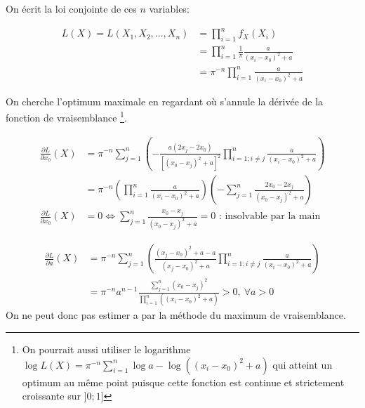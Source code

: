 \documentclass[12pt,a4paper,titlepage]{article}
\numberwithin{equation}{section}
\begin{document}
On écrit la loi conjointe de ces $n$ variables:

\begin{align*}
L (X) = L\left( {{X_1},{X_2},...,{X_n}} \right) & = \prod\limits_{i = 1}^n {{f_X}\left( {{X_i}} \right)} \\
& = \prod\limits_{i = 1}^n {\frac{1}{\pi }\frac{a}{{{{\left( {{x_i} - {x_0}} \right)}^2} + a}}} \\
& = {\pi ^{ - n}}\prod\limits_{i = 1}^n {\frac{a}{{{{\left( {{x_i} - {x_0}} \right)}^2} + a}}}
\end{align*}

On cherche l'optimum maximale en regardant où s'annule la dérivée de la fonction de vraisemblance
\footnote{On pourrait aussi utiliser le logarithme $\log{L(X)} = \pi^{-n} \sum\limits_{i=1}^{n} \log{a} -
\log{((x_i-x_0)^2+a)}$ qui atteint un optimum au même point puisque cette fonction est continue et strictement croissante
sur $]0;1]$}.

\begin{align*}
\frac{{\partial L}}{{\partial {x_0}}}\left( X \right) & = {\pi ^{ - n}}\sum\limits_{j = 1}^n {\left( { - \frac{{a\left( {2{x_j} - 2{x_0}} \right)}}{{{{\left[ {{{\left( {{x_0} - {x_j}} \right)}^2} + a} \right]}^2}}}\prod\limits_{i = 1;i \ne j}^n {\frac{a}{{{{\left( {{x_i} - {x_0}} \right)}^2} + a}}} } \right)}\\
&  = {\pi ^{ - n}}\left( {\prod\limits_{i = 1}^n {\frac{a}{{{{\left( {{x_i} - {x_0}} \right)}^2} + a}}} } \right)\left( { - \sum\limits_{j = 1}^n {\frac{{2{x_0} - 2{x_j}}}{{{{\left( {{x_0} - {x_j}} \right)}^2} + a}}} } \right) \\
\frac{{\partial L}}{{\partial {x_0}}}\left( X \right) & = 0 \Leftrightarrow \sum\limits_{j = 1}^n {\frac{{{x_0} - {x_j}}}{{{{\left( {{x_0} - {x_j}} \right)}^2} + a}}}  = 0 \text{ : insolvable par la main}
\end{align*}

\begin{align*}
\frac{{\partial L}}{{\partial a}}\left( X \right) & = {\pi ^{ - n}}\sum\limits_{j = 1}^n {\left( {\frac{{{{\left( {{x_j} - {x_0}} \right)}^2} + a - a}}{{{{\left( {{x_j} - {x_0}} \right)}^2} + a}}\prod\limits_{i = 1;i \ne j}^n {\frac{a}{{{{\left( {{x_i} - {x_0}} \right)}^2} + a}}} } \right)}\\
&  = {\pi ^{ - n}}{a^{n - 1}}\frac{{\sum\limits_{j = 1}^n {{{\left( {{x_0} - {x_j}} \right)}^2}} }}{{\prod\limits_{i = 1}^n {\left( {{{\left( {{x_i} - {x_0}} \right)}^2} + a} \right)} }} > 0,\ \forall a > 0
\end{align*}
On ne peut donc pas estimer a par la méthode du maximum de vraisemblance.
\end{document}
